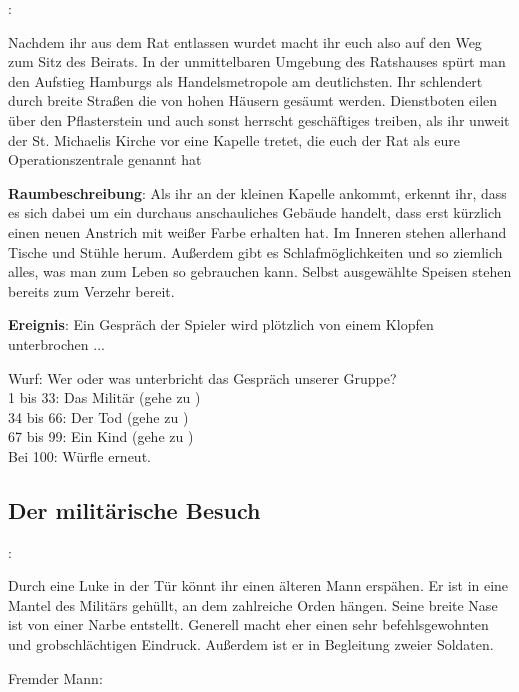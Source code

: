
:

Nachdem ihr aus dem Rat entlassen wurdet macht ihr euch also auf den Weg zum Sitz des Beirats. In der unmittelbaren Umgebung des Ratshauses spürt man den Aufstieg Hamburgs als Handelsmetropole am deutlichsten. Ihr schlendert durch breite Straßen die von hohen Häusern gesäumt werden. Dienstboten eilen über den Pflasterstein und auch sonst herrscht geschäftiges treiben, als ihr unweit der St. Michaelis Kirche vor eine Kapelle tretet, die euch der Rat als eure Operationszentrale genannt hat

\textbf{Raumbeschreibung}: Als ihr an der kleinen Kapelle ankommt, erkennt ihr, dass es sich dabei um ein durchaus anschauliches Gebäude handelt, dass erst kürzlich einen neuen Anstrich mit weißer Farbe erhalten hat. Im Inneren stehen allerhand Tische und Stühle herum. Außerdem gibt es Schlafmöglichkeiten und so ziemlich alles, was man zum Leben so gebrauchen kann. Selbst ausgewählte Speisen stehen bereits zum Verzehr bereit.

\textbf{Ereignis}: Ein Gespräch der Spieler wird plötzlich von einem Klopfen unterbrochen ...

\begin{tcolorbox}
  Wurf: Wer oder was unterbricht das Gespräch unserer Gruppe? \\
  1 bis 33: Das Militär (gehe zu \blue{\ref{militär}}) \\
  34 bis 66: Der Tod (gehe zu \blue{\ref{tot}}) \\
  67 bis 99: Ein Kind (gehe zu \blue{\ref{kind}}) \\
  Bei 100: Würfle erneut.
\end{tcolorbox}

\subsection*{Der militärische Besuch}
\label{militär}

:

Durch eine Luke in der Tür könnt ihr einen älteren Mann erspähen. Er ist in eine Mantel des Militärs gehüllt, an dem zahlreiche Orden hängen. Seine breite Nase ist von einer Narbe entstellt. Generell macht eher einen sehr befehlsgewohnten und grobschlächtigen Eindruck. Außerdem ist er in Begleitung zweier Soldaten.

Fremder Mann:

